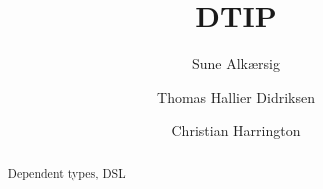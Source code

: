 \documentclass[oribibl]{llncs}
\newcommand{\keywords}[1]{\par\addvspace\baselineskip
\noindent\keywordname\enspace\ignorespaces#1}
\begin{document}
\mainmatter
\title{DTIP}
\author{Sune Alkærsig \and Thomas Hallier Didriksen \and Christian Harrington \\
}

\maketitle
\begin{abstract}

\keywords{Dependent types, DSL}
\end{abstract}














\clearpage %
\appendix
\end{document}

